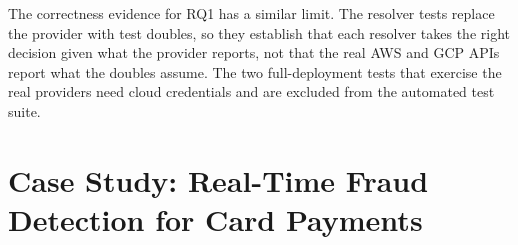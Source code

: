 The correctness evidence for RQ1 has a similar limit. The resolver tests replace the provider with
test doubles, so they establish that each resolver takes the right decision given what the provider
reports, not that the real AWS and GCP APIs report what the doubles assume. The two full-deployment
tests that exercise the real providers need cloud credentials and are excluded from the automated
test suite.






























































































\chapter{Case Study: Real-Time Fraud Detection for Card Payments}
\label{cha:case-study}

